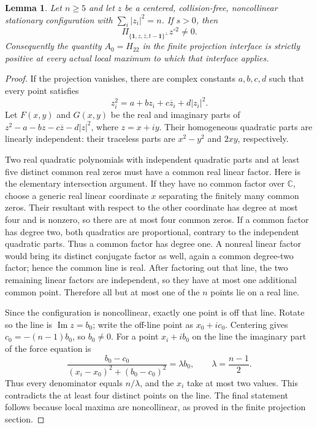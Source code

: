 \documentclass[11pt]{article}
\newtheorem{lemma}[theorem]{Lemma}
\theoremstyle{remark}
\numberwithin{equation}{section}
\begin{document}
\begin{lemma}\label{lem:noorigin-oct8-quadratic-nonzero}
Let $n\ge5$ and let $z$ be a centered, collision-free, noncollinear
stationary configuration with $\sum_i|z_i|^2=n$. If $s>0$, then
\[
 \Pi_{\{\mathbf1,z,\overline z,t-\mathbf1\}^{\perp}}z^{\circ2}
 \ne0.
\]
Consequently the quantity $A_0=H_{22}$ in the finite projection
interface is strictly positive at every actual local maximum to
which that interface applies.
\end{lemma}
\begin{proof}
If the projection vanishes, there are complex constants $a,b,c,d$
such that every point satisfies
\[
             z_i^2=a+bz_i+c\overline z_i+d|z_i|^2.
\]
Let $F(x,y)$ and $G(x,y)$ be the real and imaginary parts of
$z^2-a-bz-c\overline z-d|z|^2$, where $z=x+iy$.
Their homogeneous quadratic parts are linearly independent: their
traceless parts are $x^2-y^2$ and $2xy$, respectively.

Two real quadratic polynomials with independent quadratic parts
and at least five distinct common real zeros must have a common
real linear factor. Here is the elementary intersection argument.
If they have no common factor over $\mathbb C$, choose a generic
real linear coordinate $x$ separating the finitely many common
zeros. Their resultant with respect to the other coordinate has
degree at most four and is nonzero, so there are at most four
common zeros. If a common factor has degree two, both quadratics
are proportional, contrary to the independent quadratic parts.
Thus a common factor has degree one. A nonreal linear factor
would bring its distinct conjugate factor as well, again a common
degree-two factor; hence the common line is real. After factoring
out that line, the two remaining linear factors are independent,
so they have at most one additional common point. Therefore all
but at most one of the $n$ points lie on a real line.

Since the configuration is noncollinear, exactly one point is off
that line. Rotate so the line is $\operatorname{Im}z=b_0$;
write the off-line point as $x_0+ic_0$. Centering gives
$c_0=-(n-1)b_0$, so $b_0\ne0$. For a point $x_i+ib_0$ on
the line the imaginary part of the force equation is
\[
 \frac{b_0-c_0}{(x_i-x_0)^2+(b_0-c_0)^2}=\lambda b_0,
 \qquad \lambda=\frac{n-1}{2}.
\]
Thus every denominator equals $n/\lambda$, and the $x_i$ take
at most two values. This contradicts the at least four distinct
points on the line. The final statement follows because local
maxima are noncollinear, as proved in the finite projection section.
\end{proof}
\end{document}

